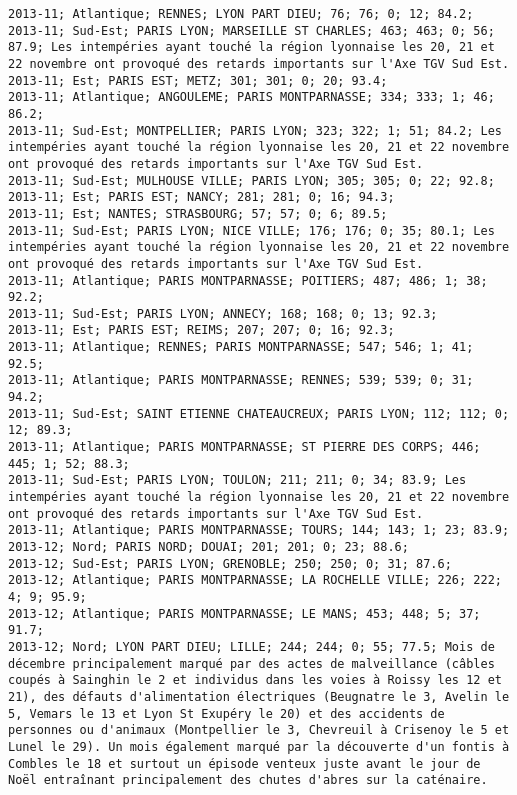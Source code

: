 \documentclass{article}
\begin{document}
\begin{Verbatim}[commandchars=\\\{\}]
2013-11; Atlantique; RENNES; LYON PART DIEU; 76; 76; 0; 12; 84.2; 
2013-11; Sud-Est; PARIS LYON; MARSEILLE ST CHARLES; 463; 463; 0; 56; 87.9; Les intempéries ayant touché la région lyonnaise les 20, 21 et 22 novembre ont provoqué des retards importants sur l'Axe TGV Sud Est.
2013-11; Est; PARIS EST; METZ; 301; 301; 0; 20; 93.4; 
2013-11; Atlantique; ANGOULEME; PARIS MONTPARNASSE; 334; 333; 1; 46; 86.2; 
2013-11; Sud-Est; MONTPELLIER; PARIS LYON; 323; 322; 1; 51; 84.2; Les intempéries ayant touché la région lyonnaise les 20, 21 et 22 novembre ont provoqué des retards importants sur l'Axe TGV Sud Est.
2013-11; Sud-Est; MULHOUSE VILLE; PARIS LYON; 305; 305; 0; 22; 92.8; 
2013-11; Est; PARIS EST; NANCY; 281; 281; 0; 16; 94.3; 
2013-11; Est; NANTES; STRASBOURG; 57; 57; 0; 6; 89.5; 
2013-11; Sud-Est; PARIS LYON; NICE VILLE; 176; 176; 0; 35; 80.1; Les intempéries ayant touché la région lyonnaise les 20, 21 et 22 novembre ont provoqué des retards importants sur l'Axe TGV Sud Est.
2013-11; Atlantique; PARIS MONTPARNASSE; POITIERS; 487; 486; 1; 38; 92.2; 
2013-11; Sud-Est; PARIS LYON; ANNECY; 168; 168; 0; 13; 92.3; 
2013-11; Est; PARIS EST; REIMS; 207; 207; 0; 16; 92.3; 
2013-11; Atlantique; RENNES; PARIS MONTPARNASSE; 547; 546; 1; 41; 92.5; 
2013-11; Atlantique; PARIS MONTPARNASSE; RENNES; 539; 539; 0; 31; 94.2; 
2013-11; Sud-Est; SAINT ETIENNE CHATEAUCREUX; PARIS LYON; 112; 112; 0; 12; 89.3; 
2013-11; Atlantique; PARIS MONTPARNASSE; ST PIERRE DES CORPS; 446; 445; 1; 52; 88.3; 
2013-11; Sud-Est; PARIS LYON; TOULON; 211; 211; 0; 34; 83.9; Les intempéries ayant touché la région lyonnaise les 20, 21 et 22 novembre ont provoqué des retards importants sur l'Axe TGV Sud Est.
2013-11; Atlantique; PARIS MONTPARNASSE; TOURS; 144; 143; 1; 23; 83.9; 
2013-12; Nord; PARIS NORD; DOUAI; 201; 201; 0; 23; 88.6; 
2013-12; Sud-Est; PARIS LYON; GRENOBLE; 250; 250; 0; 31; 87.6; 
2013-12; Atlantique; PARIS MONTPARNASSE; LA ROCHELLE VILLE; 226; 222; 4; 9; 95.9; 
2013-12; Atlantique; PARIS MONTPARNASSE; LE MANS; 453; 448; 5; 37; 91.7; 
2013-12; Nord; LYON PART DIEU; LILLE; 244; 244; 0; 55; 77.5; Mois de décembre principalement marqué par des actes de malveillance (câbles coupés à Sainghin le 2 et individus dans les voies à Roissy les 12 et 21), des défauts d'alimentation électriques (Beugnatre le 3, Avelin le 5, Vemars le 13 et Lyon St Exupéry le 20) et des accidents de personnes ou d'animaux (Montpellier le 3, Chevreuil à Crisenoy le 5 et Lunel le 29). Un mois également marqué par la découverte d'un fontis à Combles le 18 et surtout un épisode venteux juste avant le jour de Noël entraînant principalement des chutes d'abres sur la caténaire.

\end{Verbatim}
\end{document}
